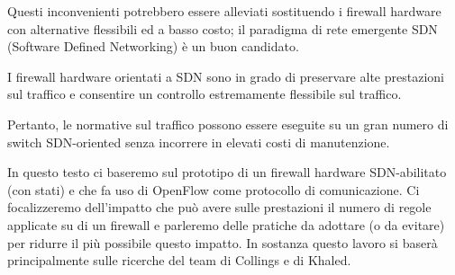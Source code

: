 Questi inconvenienti potrebbero essere alleviati sostituendo i firewall hardware con alternative flessibili ed a basso costo; il paradigma di rete emergente SDN (Software Defined Networking) è un buon candidato.

I firewall hardware orientati a SDN sono in grado di preservare alte prestazioni sul traffico e consentire un controllo estremamente flessibile sul traffico.

Pertanto, le normative sul traffico possono essere eseguite su un gran numero di switch SDN-oriented senza incorrere in elevati costi di manutenzione.

In questo testo ci baseremo sul prototipo di un firewall hardware SDN-abilitato (con stati) e che fa uso di OpenFlow come protocollo di comunicazione. Ci focalizzeremo dell'impatto che può avere sulle prestazioni il numero di regole applicate su di un firewall e parleremo delle pratiche da adottare (o da evitare) per ridurre il più possibile questo impatto.
\newline
\newline
In sostanza questo lavoro si baserà principalmente sulle ricerche del team di Collings\cite{collings2014openflow} e di Khaled\cite{salah2011performance}.

